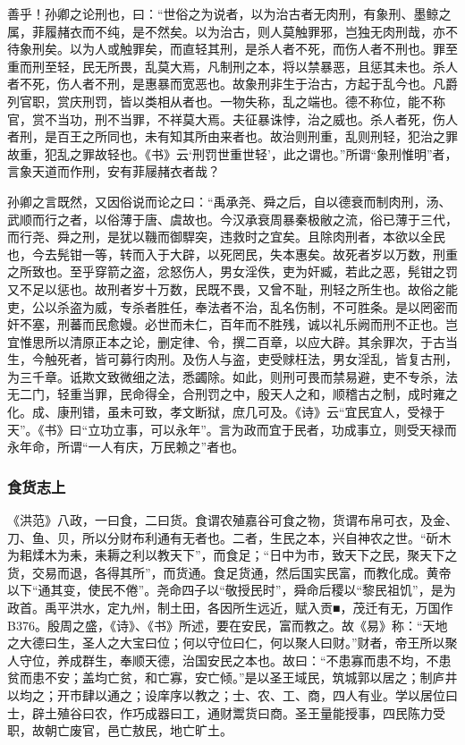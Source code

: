 \documentclass[]{article}
\begin{document}
善乎！孙卿之论刑也，曰：``世俗之为说者，以为治古者无肉刑，有象刑、墨鲸之属，菲履赭衣而不纯，是不然矣。以为治古，则人莫触罪邪，岂独无肉刑哉，亦不待象刑矣。以为人或触罪矣，而直轻其刑，是杀人者不死，而伤人者不刑也。罪至重而刑至轻，民无所畏，乱莫大焉，凡制刑之本，将以禁暴恶，且惩其未也。杀人者不死，伤人者不刑，是惠暴而宽恶也。故象刑非生于治古，方起于乱今也。凡爵列官职，赏庆刑罚，皆以类相从者也。一物失称，乱之端也。德不称位，能不称官，赏不当功，刑不当罪，不祥莫大焉。夫征暴诛悖，治之威也。杀人者死，伤人者刑，是百王之所同也，未有知其所由来者也。故治则刑重，乱则刑轻，犯治之罪故重，犯乱之罪故轻也。《书》云`刑罚世重世轻'，此之谓也。''所谓``象刑惟明''者，言象天道而作刑，安有菲屦赭衣者哉？

孙卿之言既然，又因俗说而论之曰：``禹承尧、舜之后，自以德衰而制肉刑，汤、武顺而行之者，以俗薄于唐、虞故也。今汉承衰周暴秦极敝之流，俗已薄于三代，而行尧、舜之刑，是犹以鞿而御駻突，违救时之宜矣。且除肉刑者，本欲以全民也，今去髡钳一等，转而入于大辟，以死罔民，失本惠矣。故死者岁以万数，刑重之所致也。至乎穿箭之盗，忿怒伤人，男女淫佚，吏为奸臧，若此之恶，髡钳之罚又不足以惩也。故刑者岁十万数，民既不畏，又曾不耻，刑轻之所生也。故俗之能吏，公以杀盗为威，专杀者胜任，奉法者不治，乱名伤制，不可胜条。是以罔密而奸不塞，刑蕃而民愈嫚。必世而未仁，百年而不胜残，诚以礼乐阙而刑不正也。岂宜惟思所以清原正本之论，删定律、令，撰二百章，以应大辟。其余罪次，于古当生，今触死者，皆可募行肉刑。及伤人与盗，吏受赇枉法，男女淫乱，皆复古刑，为三千章。诋欺文致微细之法，悉蠲除。如此，则刑可畏而禁易避，吏不专杀，法无二门，轻重当罪，民命得全，合刑罚之中，殷天人之和，顺稽古之制，成时雍之化。成、康刑错，虽未可致，孝文断狱，庶几可及。《诗》云``宜民宜人，受禄于天''。《书》曰``立功立事，可以永年''。言为政而宜于民者，功成事立，则受天禄而永年命，所谓``一人有庆，万民赖之''者也。

\hypertarget{header-n1591}{%
\subsubsection{食货志上}\label{header-n1591}}

《洪范》八政，一曰食，二曰货。食谓农殖嘉谷可食之物，货谓布帛可衣，及金、刀、鱼、贝，所以分财布利通有无者也。二者，生民之本，兴自神农之世。``斫木为耜煣木为耒，耒耨之利以教天下''，而食足；``日中为市，致天下之民，聚天下之货，交易而退，各得其所''，而货通。食足货通，然后国实民富，而教化成。黄帝以下``通其变，使民不倦''。尧命四子以``敬授民时''，舜命后稷以``黎民祖饥''，是为政首。禹平洪水，定九州，制土田，各因所生远近，赋入贡■，茂迁有无，万国作B376。殷周之盛，《诗》、《书》所述，要在安民，富而教之。故《易》称：``天地之大德曰生，圣人之大宝曰位；何以守位曰仁，何以聚人曰财。''财者，帝王所以聚人守位，养成群生，奉顺天德，治国安民之本也。故曰：``不患寡而患不均，不患贫而患不安；盖均亡贫，和亡寡，安亡倾。''是以圣王域民，筑城郭以居之；制庐井以均之；开市肆以通之；设庠序以教之；士、农、工、商，四人有业。学以居位曰士，辟土殖谷曰农，作巧成器曰工，通财鬻货曰商。圣王量能授事，四民陈力受职，故朝亡废官，邑亡敖民，地亡旷土。
\end{document}

